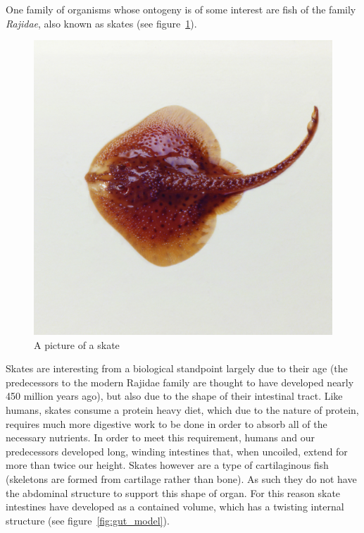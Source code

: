 \documentclass[condensed]{union-cs-thesis}
\begin{document}
\par
One family of organisms whose ontogeny is of some interest are fish of the family \emph{Rajidae}, also
known as skates (see figure~\ref{fig:skatepic}).
\begin{figure}[h]
  \centering
  \includegraphics[scale=0.25]{skate-pic}
  \caption{A picture of a skate}
  \label{fig:skatepic}
\end{figure}
Skates are interesting from a biological standpoint largely due to their age (the predecessors to
the modern Rajidae family are thought to have developed nearly 450 million years ago), but also due to
the shape of their intestinal tract.  Like humans, skates consume a protein heavy diet, which due to the
nature of protein, requires much more digestive work to be done in order to absorb all of the necessary
nutrients.  In order to meet this requirement, humans and our predecessors developed long, winding
intestines that, when uncoiled, extend for more than twice our height.  Skates however are a type of
cartilaginous fish (skeletons are formed from cartilage rather than bone).  As such they do not have
the abdominal structure to support this shape of organ.  For this reason skate intestines have developed
as a contained volume, which has a twisting internal structure (see figure~\ref{fig:gut_model}).
\end{document}
